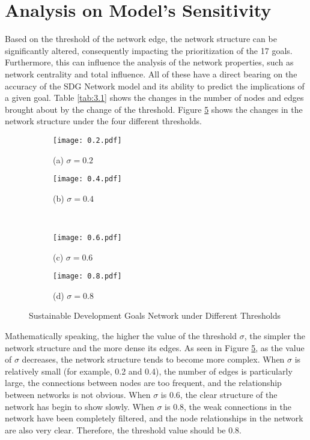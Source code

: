 \documentclass[12pt]{article}  %
\begin{document}
\section{Analysis on Model's Sensitivity}
Based on the threshold of the network edge, the network structure can be significantly altered, consequently impacting the prioritization of the 17 goals. Furthermore, this can influence the analysis of the network properties, such as network centrality and total influence.  All of these have a direct bearing on the accuracy of the SDG Network model and its ability to predict the implications of a given goal. Table \ref{tab:3.1} shows the changes in the number of nodes and edges brought about by the change of the threshold. 
Figure \ref{fig:8.1} shows the changes in the network structure under the four different thresholds.
\begin{figure}[htbp]
\centering
\begin{subfigure}[b]{.35\textwidth}
\texttt{[image: 0.2.pdf]}
\caption*{(a) $\sigma =0.2$}\label{subfig:left}
\end{subfigure}\qquad
\begin{subfigure}[b]{.35\textwidth}
\texttt{[image: 0.4.pdf]}
\caption*{(b) $\sigma=0.4$}\label{subfig:right}
\end{subfigure}
\\
\begin{subfigure}[b]{.35\textwidth}
\texttt{[image: 0.6.pdf]}
\caption*{(c) $\sigma=0.6$}\label{subfig:left}
\end{subfigure}\qquad
\begin{subfigure}[b]{.35\textwidth}
\texttt{[image: 0.8.pdf]}
\caption*{(d) $\sigma=0.8$}\label{subfig:left}
\end{subfigure}\caption{Sustainable Development Goals Network under Different Thresholds}\label{fig:8.1}
\end{figure}

Mathematically speaking, the higher the value of the threshold $\sigma$, the simpler the network structure and the more dense its edges. As seen in Figure \ref{fig:8.1}, as the value of $\sigma$ decreases, the network structure tends to become more complex. When  $\sigma$ is relatively small (for example, 0.2 and 0.4), the number of edges is particularly large, the connections between nodes are too frequent, and the relationship between networks is not obvious. When  $\sigma$ is 0.6, the clear structure of the network has begin to show slowly. When  $\sigma$ is 0.8, the weak connections in the network have been completely filtered, and the node relationships in the network are also very clear. Therefore, the threshold value should be 0.8.
\end{document}
